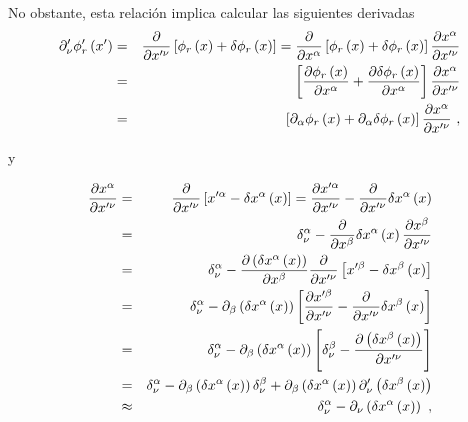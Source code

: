 \noindent
No obstante, esta relación implica calcular las siguientes derivadas
\begin{eqnarray}
\partial _{\nu }^{\prime }\phi _{r}^{\prime }\left( x^{\prime }\right)  &=& \frac{\partial }{\partial x^{\prime \nu }}\left[ \phi _{r}\left( x\right) +\delta \phi _{r}\left( x\right) \right] =\frac{\partial }{\partial x^{\alpha }}\left[ \phi _{r}\left( x\right) +\delta \phi _{r}\left( x\right) \right] \frac{\partial x^{\alpha }}{\partial x^{\prime \nu }}  \notag \\
&=&\left[ \frac{\partial \phi _{r}\left( x\right) }{\partial x^{\alpha }}+\frac{\partial \delta \phi _{r}\left( x\right) }{\partial x^{\alpha }}\right]\frac{\partial x^{\alpha }}{\partial x^{\prime \nu }}  \notag \\
&=&\left[ \partial _{\alpha }\phi _{r}\left( x\right) +\partial _{\alpha}\delta \phi _{r}\left( x\right) \right] \frac{\partial x^{\alpha }}{\partial x^{\prime \nu }}~,
\label{eq2.40}
\end{eqnarray}

\noindent
y

\begin{eqnarray}
\frac{\partial x^{\alpha }}{\partial x^{\prime \nu }} &=&\frac{\partial }{\partial x^{\prime \nu }}\left[ x^{\prime \alpha }-\delta x^{\alpha }\left(x\right) \right] =\frac{\partial x^{\prime \alpha }}{\partial x^{\prime \nu }}-\frac{\partial }{\partial x^{\prime \nu }}\delta x^{\alpha }\left(x\right)   \notag \\
&=&\delta _{\nu }^{\alpha }-\frac{\partial }{\partial x^{\beta }}\delta x^{\alpha }\left( x\right) \frac{\partial x^{\beta }}{\partial x^{\prime \nu}}  \notag \\
&=&\delta _{\nu }^{\alpha }-\frac{\partial \left( \delta x^{\alpha }\left(x\right) \right) }{\partial x^{\beta }}\frac{\partial }{\partial x^{\prime \nu }}\left[ x^{\prime \beta }-\delta x^{\beta }\left( x\right) \right]  \notag \\
&=&\delta _{\nu }^{\alpha }-\partial _{\beta }\left( \delta x^{\alpha}\left( x\right) \right) \left[ \frac{\partial x^{\prime \beta }}{\partial x^{\prime \nu }}-\frac{\partial }{\partial x^{\prime \nu }}\delta x^{\beta}\left( x\right) \right]   \notag \\
&=&\delta _{\nu }^{\alpha }-\partial _{\beta }\left( \delta x^{\alpha }\left( x\right) \right) \left[ \delta _{\nu }^{\beta }-\frac{\partial \left( \delta x^{\beta }\left( x\right) \right) }{\partial x^{\prime \nu }}\right]   \notag \\
&=&\delta _{\nu }^{\alpha }-\partial _{\beta }\left( \delta x^{\alpha}\left( x\right) \right) \delta _{\nu }^{\beta }+\partial _{\beta }\left(\delta x^{\alpha }\left( x\right) \right) \partial _{\nu }^{\prime }\left(\delta x^{\beta }\left( x\right) \right)   \notag \\
&\approx &\delta _{\nu }^{\alpha }-\partial _{\nu }\left( \delta x^{\alpha}\left( x\right) \right) ~,
\label{eq2.41}
\end{eqnarray}

